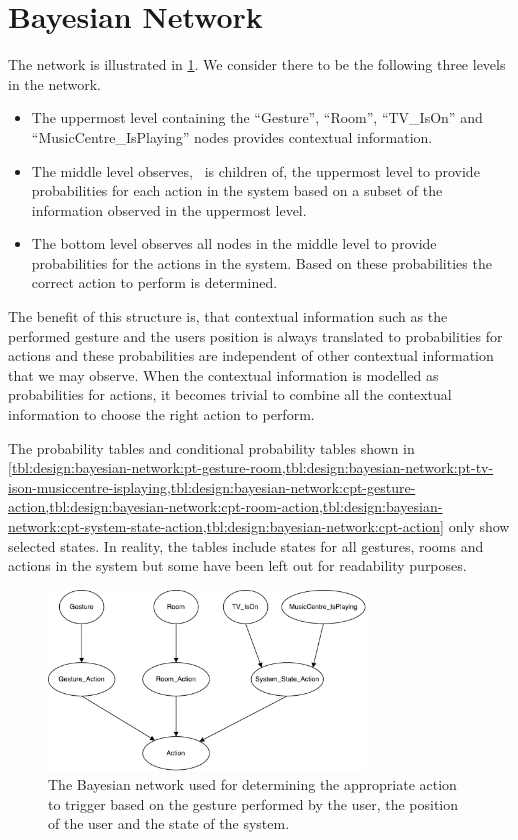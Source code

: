 \section{Bayesian Network}
\label{sec:design:bayesian-network}

The network is illustrated in \cref{fig:design:bayesian-network:overview}. We consider there to be the following three levels in the network.

\begin{itemize}
\item The uppermost level containing the ``Gesture'', ``Room'', ``TV\_IsOn'' and ``MusicCentre\_IsPlaying'' nodes provides contextual information.
\item The middle level observes, \ie~is children of, the uppermost level to provide probabilities for each action in the system based on a subset of the information observed in the uppermost level.
\item The bottom level observes all nodes in the middle level to provide probabilities for the actions in the system. Based on these probabilities the correct action to perform is determined.
\end{itemize}

The benefit of this structure is, that contextual information such as the performed gesture and the users position is always translated to probabilities for actions and these probabilities are independent of other contextual information that we may observe. When the contextual information is modelled as probabilities for actions, it becomes trivial to combine all the contextual information to choose the right action to perform.

The probability tables and conditional probability tables shown in \cref{tbl:design:bayesian-network:pt-gesture-room,tbl:design:bayesian-network:pt-tv-ison-musiccentre-isplaying,tbl:design:bayesian-network:cpt-gesture-action,tbl:design:bayesian-network:cpt-room-action,tbl:design:bayesian-network:cpt-system-state-action,tbl:design:bayesian-network:cpt-action} only show selected states. In reality, the tables include states for all gestures, rooms and actions in the system but some have been left out for readability purposes.

\begin{figure}[h!]
\centering
\includegraphics[width=0.75\textwidth]{images/bayesian-network}
\caption{The Bayesian network used for determining the appropriate action to trigger based on the gesture performed by the user, the position of the user and the state of the system.}
\label{fig:design:bayesian-network:overview}
\end{figure}

